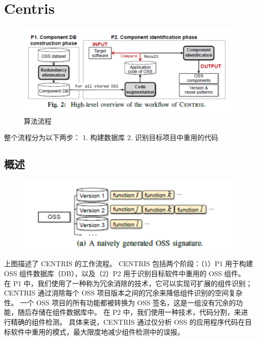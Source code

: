 \documentclass{cjc}
\begin{document}
\maketitle


\section{Centris}
\begin{figure}[htb]
  \centering
  \includegraphics[width=\linewidth]{pics/算法流程.png}
  \caption{算法流程}
\end{figure}
整个流程分为以下两步：
1. 构建数据库
2. 识别目标项目中重用的代码



\subsection{概述}
\begin{figure}[htb]
  \centering
  \includegraphics[width=\linewidth]{pics/image-20220622225558096.png}
\end{figure}
上图描述了 CENTRIS 的工作流程。 CENTRIS 包括两个阶段：（1）P1 用于构建 OSS 组件数据库（DB），以及（2）P2 用于识别目标软件中重用的 OSS 组件。 在 P1 中，我们使用了一种称为冗余消除的技术，它可以实现可扩展的组件识别； CENTRIS 通过消除每个 OSS 项目版本之间的冗余来降低组件识别的空间复杂性。 一个 OSS 项目的所有功能都被转换为 OSS 签名，这是一组没有冗余的功能，随后存储在组件数据库中。 在 P2 中，我们使用一种技术，代码分割，来进行精确的组件检测。 具体来说，CENTRIS 通过仅分析 OSS 的应用程序代码在目标软件中重用的模式，最大限度地减少组件检测中的误报。
\end{document}
